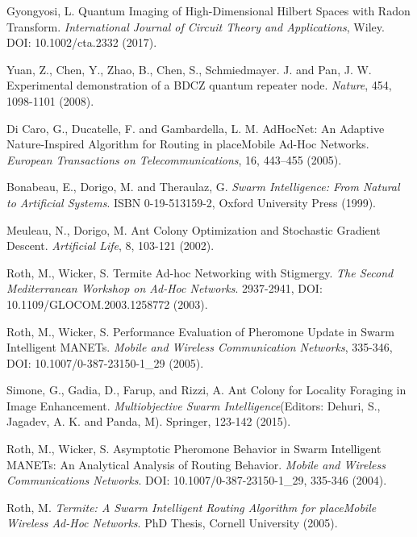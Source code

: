 \documentclass[11pt]{article}%
\begin{document}
\begin{enumerate}[ {[}1{]} ]
\item \label{ref9} Gyongyosi, L. Quantum Imaging of High-Dimensional Hilbert Spaces with Radon Transform. \textit{International Journal of Circuit Theory and Applications}, Wiley. DOI: 10.1002/cta.2332 (2017).

\item \label{ref10} Yuan, Z., Chen, Y., Zhao, B., Chen, S., Schmiedmayer. J. and Pan, J. W. Experimental demonstration of a BDCZ quantum repeater node. \textit{Nature}, 454, 1098-1101 (2008).

\item \label{ref11} Di Caro, G., Ducatelle, F. and Gambardella, L. M. AdHocNet: An Adaptive Nature-Inspired Algorithm for Routing in placeMobile Ad-Hoc Networks. \textit{European Transactions on Telecommunications}, 16, 443--455 (2005).

\item \label{ref12} Bonabeau, E., Dorigo, M. and Theraulaz, G. \textit{Swarm Intelligence: From Natural to Artificial Systems}. ISBN 0-19-513159-2, Oxford University Press (1999).

\item \label{ref13} Meuleau, N., Dorigo, M. Ant Colony Optimization and Stochastic Gradient Descent. \textit{Artificial Life}, 8, 103-121 (2002).

\item \label{ref14} Roth, M., Wicker, S. Termite Ad-hoc Networking with Stigmergy. \textit{The Second Mediterranean Workshop on Ad-Hoc Networks}. 2937-2941, DOI: 10.1109/GLOCOM.2003.1258772 (2003).

\item \label{ref15} Roth, M., Wicker, S. Performance Evaluation of Pheromone Update in Swarm Intelligent MANETs. \textit{Mobile and Wireless Communication Networks}, 335-346, DOI: 10.1007/0-387-23150-1\_29 (2005).

\item \label{ref16} Simone, G., Gadia, D., Farup, and Rizzi, A. Ant Colony for Locality Foraging in Image Enhancement. \textit{Multiobjective Swarm Intelligence}(Editors: Dehuri, S., Jagadev, A. K. and Panda, M). Springer, 123-142 (2015).

\item \label{ref17} Roth, M., Wicker, S. Asymptotic Pheromone Behavior in Swarm Intelligent MANETs: An Analytical Analysis of Routing Behavior. \textit{Mobile and Wireless Communications Networks}. DOI: 10.1007/0-387-23150-1\_29, 335-346 (2004).

\item \label{ref18} Roth, M. \textit{Termite: A Swarm Intelligent Routing Algorithm for placeMobile Wireless Ad-Hoc Networks}. PhD Thesis, Cornell University (2005).


\end{enumerate}
\end{document}
